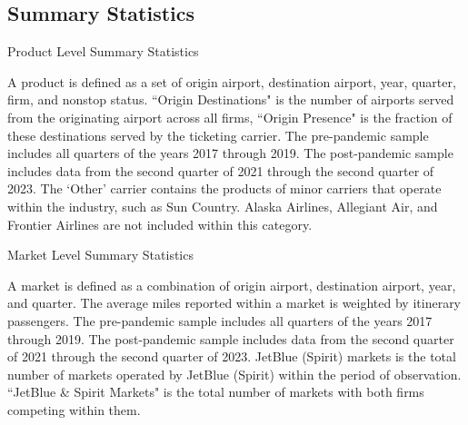 \documentclass{article}
\begin{document}
\subsection{Summary Statistics}
   \begin{table}
    \caption{Product Level Summary Statistics}
    \label{tab:Summary_Statistics_Product}
                    \vspace{-15mm}
                    \begin{center}
    
                        \end{center}
                    \vspace{-5mm}
    \footnotesize{A product is defined as a set of origin airport, destination airport, year, quarter, firm, and nonstop status. ``Origin Destinations" is the number of airports served from the originating airport across all firms, ``Origin Presence" is the fraction of these destinations served by the ticketing carrier. The pre-pandemic sample includes all quarters of the years 2017 through 2019. The post-pandemic sample includes data from the second quarter of 2021 through the second quarter of 2023. The `Other' carrier contains the products of minor carriers that operate within the industry, such as Sun Country. Alaska Airlines, Allegiant Air, and Frontier Airlines are not included within this category.}
    \end{table}

    \begin{table}
        \caption{Market Level Summary Statistics}
        \label{tab:Summary_Statistics_Market}
                \vspace{-15mm}
\begin{center}
    
            \end{center}
    \vspace{-5mm}
            \footnotesize{A market is defined as a combination of origin airport, destination airport, year, and quarter. The average miles reported within a market is weighted by itinerary passengers. The pre-pandemic sample includes all quarters of the years 2017 through 2019. The post-pandemic sample includes data from the second quarter of 2021 through the second quarter of 2023. JetBlue (Spirit) markets is the total number of markets operated by JetBlue (Spirit) within the period of observation. ``JetBlue \& Spirit Markets" is the total number of markets with both firms competing within them.}

    \end{table}
\end{document}
